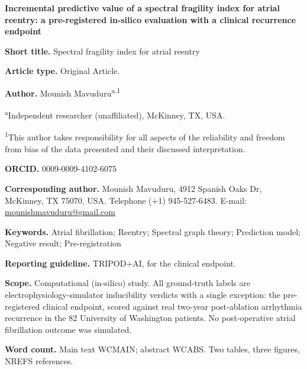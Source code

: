 
\thispagestyle{empty}

\begin{center}
{\Large\bfseries Incremental predictive value of a spectral fragility index for
atrial reentry: a pre-registered in-silico evaluation with a clinical
recurrence endpoint\par}
\end{center}

\vspace{0.7em}
\noindent\textbf{Short title.} Spectral fragility index for atrial reentry

\smallskip
\noindent\textbf{Article type.} Original Article.

\smallskip
\noindent\textbf{Author.} Mounish Mavuduru\textsuperscript{a,1}

\smallskip
\noindent\textsuperscript{a}Independent researcher (unaffiliated), McKinney, TX,
USA.

\smallskip
\noindent\textsuperscript{1}This author takes responsibility for all aspects of
the reliability and freedom from bias of the data presented and their discussed
interpretation.

\smallskip
\noindent\textbf{ORCID.} 0009-0009-4102-6075

\smallskip
\noindent\textbf{Corresponding author.} Mounish Mavuduru, 4912 Spanish Oaks Dr,
McKinney, TX 75070, USA. Telephone (+1) 945-527-6483. E-mail:
\href{mailto:mounishmavuduru@gmail.com}{mounishmavuduru@gmail.com}

\vspace{0.7em}
\noindent\textbf{Keywords.} Atrial fibrillation; Reentry; Spectral graph theory;
Prediction model; Negative result; Pre-registration

\smallskip
\noindent\textbf{Reporting guideline.} TRIPOD+AI, for the clinical endpoint.

\smallskip
\noindent\textbf{Scope.} Computational (in-silico) study. All ground-truth labels
are electrophysiology-simulator inducibility verdicts with a single exception:
the pre-registered clinical endpoint, scored against real two-year
post-ablation arrhythmia recurrence in the $82$ University of Washington
patients. No post-operative atrial fibrillation outcome was simulated.

\smallskip
\noindent\textbf{Word count.} Main text WCMAIN; abstract WCABS. Two tables,
three figures, NREFS references.

\newpage
